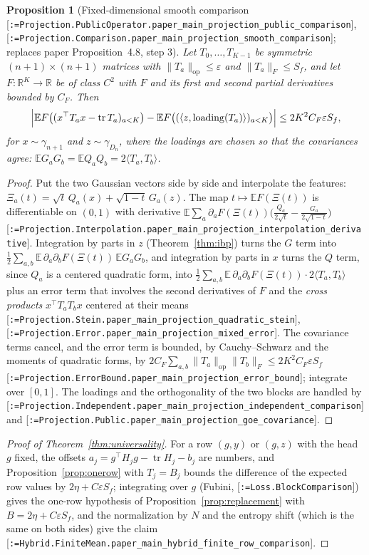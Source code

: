 \documentclass[11pt]{article}
\makeatletter
\newcommand{\formal@break}[1]{\@tfor\formal@tok:=#1\do{%
  \formal@tok
  \expandafter\ifx\formal@tok.\allowbreak\else
  \expandafter\ifx\formal@tok\_\allowbreak\fi\fi}}
\DeclareRobustCommand{\formal}[1]{\textnormal{[\texttt{\small\formal@break{#1}}]}}
\newcommand{\R}{\mathbb{R}}
\newcommand{\E}{\mathbb{E}}
\newcommand{\ip}[2]{\langle #1, #2\rangle}
\newcommand{\norm}[1]{\lVert #1\rVert}
\newcommand{\tr}{\operatorname{tr}}
\newcommand{\op}{\mathrm{op}}
\newcommand{\Fro}{F}
\newcommand{\gauss}{\gamma}
\newcommand{\Dd}{D}
\theoremstyle{plain}
\newtheorem{proposition}[theorem]{Proposition}
\theoremstyle{definition}
\makeatother
\begin{document}
\begin{proposition}[Fixed-dimensional smooth comparison \formal{Projection.PublicOperator.paper\_main\_projection\_public\_comparison}, \formal{Projection.Comparison.paper\_main\_projection\_smooth\_comparison}; replaces paper Proposition~4.8, step 3]\label{prop:smooth_comparison}
Let $T_0, \dots, T_{K-1}$ be symmetric $(n+1)\times(n+1)$ matrices with
$\norm{T_a}_\op \le \varepsilon$ and $\norm{T_a}_\Fro \le S_f$, and let $F : \R^K \to \R$
be of class $C^2$ with $F$ and its first and second partial derivatives
bounded by $C_F$. Then
\[
\Bigl|\E F\bigl((x^{\top}T_ax - \tr T_a)_{a<K}\bigr) - \E F\bigl((\ip{z}{\mathrm{loading}(T_a)})_{a<K}\bigr)\Bigr| \le 2K^2C_F\varepsilon S_f ,
\]
for $x \sim \gauss_{n+1}$ and $z \sim \gauss_{\Dd_n}$, where the loadings are
chosen so that the covariances agree: $\E G_aG_b = \E Q_aQ_b = 2\ip{T_a}{T_b}$.
\end{proposition}

\begin{proof}
Put the two Gaussian vectors side by side and interpolate the features:
$\Xi_a(t) = \sqrt t\,Q_a(x) + \sqrt{1-t}\,G_a(z)$. The map
$t \mapsto \E F(\Xi(t))$ is differentiable on $(0,1)$ with derivative
$\E\sum_a\partial_aF(\Xi(t))\bigl(\frac{Q_a}{2\sqrt t} - \frac{G_a}{2\sqrt{1-t}}\bigr)$
\formal{Projection.Interpolation.paper\_main\_projection\_interpolation\_derivative}.
Integration by parts in $z$ (Theorem~\ref{thm:ibp}) turns the $G$ term into
$\frac12\sum_{a,b}\E\,\partial_a\partial_bF(\Xi(t))\,\E G_aG_b$, and integration
by parts in $x$ turns the $Q$ term, since $Q_a$ is a centered quadratic
form, into $\frac12\sum_{a,b}\E\,\partial_a\partial_bF(\Xi(t))\cdot2\ip{T_a}{T_b}$
plus an error term that involves the second derivatives of $F$ and the
\emph{cross products} $x^{\top}T_aT_bx$ centered at their means
\formal{Projection.Stein.paper\_main\_projection\_quadratic\_stein},
\formal{Projection.Error.paper\_main\_projection\_mixed\_error}. The
covariance terms cancel, and the error term is bounded, by Cauchy--Schwarz
and the moments of quadratic forms, by $2C_F\sum_{a,b}\norm{T_a}_\op\norm{T_b}_\Fro \le 2K^2C_F\varepsilon S_f$
\formal{Projection.ErrorBound.paper\_main\_projection\_error\_bound};
integrate over $[0,1]$. The loadings and the orthogonality of the two blocks
are handled by \formal{Projection.Independent.paper\_main\_projection\_independent\_comparison}
and \formal{Projection.Public.paper\_main\_projection\_goe\_covariance}.
\end{proof}

\begin{proof}[Proof of Theorem~\ref{thm:universality}]
For a row $(g, y)$ or $(g, z)$ with the head $g$ fixed, the offsets
$a_j = g^{\top}H_jg - \tr H_j - b_j$ are numbers, and
Proposition~\ref{prop:onerow} with $T_j = B_j$ bounds the difference of the
expected row values by $2\eta + C\varepsilon S_f$; integrating over $g$
(Fubini, \formal{Loss.BlockComparison}) gives the one-row hypothesis of
Proposition~\ref{prop:replacement} with $B = 2\eta + C\varepsilon S_f$, and
the normalization by $N$ and the entropy shift (which is the same on both
sides) give the claim \formal{Hybrid.FiniteMean.paper\_main\_hybrid\_finite\_row\_comparison}.
\end{proof}
\end{document}
